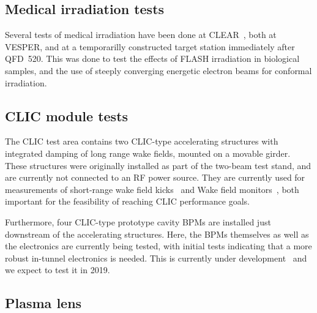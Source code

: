 \documentclass[a4paper,
               keeplastbox,   %
               ]{jacow}
\begin{document}
\subsection{Medical irradiation tests}
Several tests of medical irradiation have been done at CLEAR~\cite{Wilfrid::CLEARrev}, both at VESPER, and at a temporarilly constructed target station immediately after QFD~520.
This was done to test the effects of FLASH irradiation in biological samples, and the use of steeply converging energetic electron beams for conformal irradiation.

\subsection{CLIC module tests}
The CLIC test area contains two CLIC-type accelerating structures with integrated damping of long range wake fields, mounted on a movable girder.
These structures were originally installed as part of the two-beam test stand, and are currently not connected to an RF power source.
They are currently used for measurements of short-range wake field kicks~\cite{Antonio::IEEE-Kicks} and Wake field monitors~\cite{KyrreSjobak::CLICWS19}, both important for the feasibility of reaching CLIC performance goals.


Furthermore, four CLIC-type prototype cavity BPMs are installed just downstream of the accelerating structures.
Here, the BPMs themselves as well as the electronics are currently being tested, with initial tests indicating that a more robust in-tunnel electronics is needed.
This is currently under development~\cite{AlexejLyapin::CLICWS19} and we expect to test it in 2019.

\subsection{Plasma lens}
\end{document}
